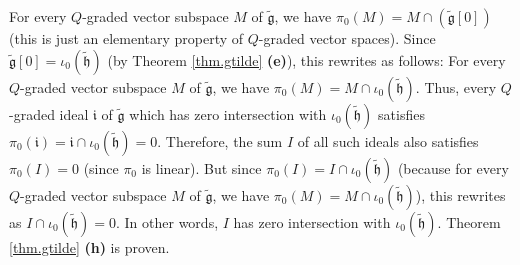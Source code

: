 \documentclass[etingof-lie.tex]{subfiles}
\begin{document}
\begin{vershort}
For every $Q$-graded vector subspace $M$ of $\widetilde{\mathfrak{g}}$, we
have $\pi_{0}\left(  M\right)  =M\cap\left(  \widetilde{\mathfrak{g}}\left[
0\right]  \right)  $ (this is just an elementary property of $Q$-graded vector
spaces). Since $\widetilde{\mathfrak{g}}\left[  0\right]  =\iota_{0}\left(
\widetilde{\mathfrak{h}}\right)  $ (by Theorem \ref{thm.gtilde} \textbf{(e)}),
this rewrites as follows: For every $Q$-graded vector subspace $M$ of
$\widetilde{\mathfrak{g}}$, we have $\pi_{0}\left(  M\right)  =M\cap\iota
_{0}\left(  \widetilde{\mathfrak{h}}\right)  $. Thus, every $Q$-graded ideal
$\mathfrak{i}$ of $\widetilde{\mathfrak{g}}$ which has zero intersection with
$\iota_{0}\left(  \widetilde{\mathfrak{h}}\right)  $ satisfies $\pi_{0}\left(
\mathfrak{i}\right)  =\mathfrak{i}\cap\iota_{0}\left(  \widetilde{\mathfrak{h}%
}\right)  =0$. Therefore, the sum $I$ of all such ideals also satisfies
$\pi_{0}\left(  I\right)  =0$ (since $\pi_{0}$ is linear). But since $\pi
_{0}\left(  I\right)  =I\cap\iota_{0}\left(  \widetilde{\mathfrak{h}}\right)
$ (because for every $Q$-graded vector subspace $M$ of
$\widetilde{\mathfrak{g}}$, we have $\pi_{0}\left(  M\right)  =M\cap\iota
_{0}\left(  \widetilde{\mathfrak{h}}\right)  $), this rewrites as $I\cap
\iota_{0}\left(  \widetilde{\mathfrak{h}}\right)  =0$. In other words, $I$ has
zero intersection with $\iota_{0}\left(  \widetilde{\mathfrak{h}}\right)  $.
Theorem \ref{thm.gtilde} \textbf{(h)} is proven.
\end{vershort}
\end{document}
